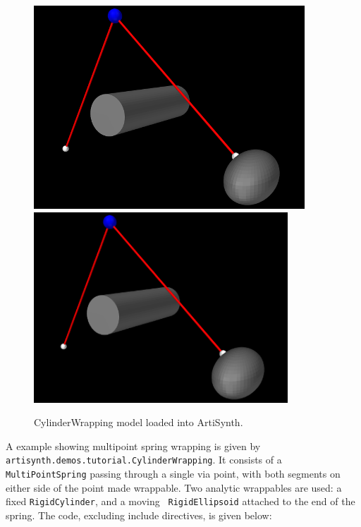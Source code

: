 \begin{figure}[t]
\begin{center}
\iflatexml
 \includegraphics[]{images/CylinderWrappingStart}
\else
 \includegraphics[width=3.75in]{images/CylinderWrappingStart}
\fi
\end{center}
\caption{CylinderWrapping model loaded into ArtiSynth.}
\label{CylinderWrapping:fig}
\end{figure}

A example showing multipoint spring wrapping is given by {\tt
artisynth.demos.tutorial.CylinderWrapping}.  It consists of a
{\tt MultiPointSpring} passing through a single via point, with both
segments on either side of the point made wrappable. Two analytic
wrappables are used: a fixed {\tt RigidCylinder}, and a moving {\tt
RigidEllipsoid} attached to the end of the spring. The code, excluding
include directives, is given below: 

\lstset{numbers=left} 
\iflatexml

\else

\fi
\lstset{numbers=none}

